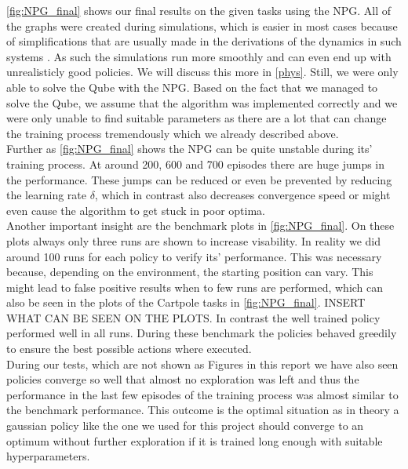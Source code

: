 \autoref{fig:NPG_final} shows our final results on the given tasks using the NPG. All of the graphs were created during simulations, which is easier in most cases because of simplifications that are usually made in the derivations of the dynamics in such systems \cite{Cazzolato2011}. As such the simulations run more smoothly and can even end up with unrealisticly good policies. We will discuss this more in \autoref{phys}. Still, we were only able to solve the Qube with the NPG. Based on the fact that we managed to solve the Qube, we assume that the algorithm was implemented correctly and we were only unable to find suitable parameters as there are a lot that can change the training process tremendously which we already described above. \\
Further as \autoref{fig:NPG_final} shows the NPG can be quite unstable during its' training process. At around 200, 600 and 700 episodes there are huge jumps in the performance. These jumps can be reduced or even be prevented by reducing the learning rate $\delta$, which in contrast also decreases convergence speed or might even cause the algorithm to get stuck in poor optima. \\
Another important insight are the benchmark plots in \autoref{fig:NPG_final}. On these plots always only three runs are shown to increase visability. In reality we did around 100 runs for each policy to verify its' performance. This was necessary because, depending on the environment, the starting position can vary. This might lead to false positive results when to few runs are performed, which can also be seen in the plots of the Cartpole tasks in \autoref{fig:NPG_final}. INSERT WHAT CAN BE SEEN ON THE PLOTS. In contrast the well trained policy performed well in all runs. During these benchmark the policies behaved greedily to ensure the best possible actions where executed. \\
During our tests, which are not shown as Figures in this report we have also seen policies converge so well that almost no exploration was left and thus the performance in the last few episodes of the training process was almost similar to the benchmark performance. This outcome is the optimal situation as in theory a gaussian policy like the one we used for this project should converge to an optimum without further exploration if it is trained long enough with suitable hyperparameters.

